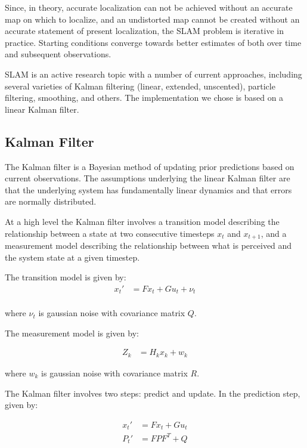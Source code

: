 \documentclass[prodmode,acmtecs]{acmsmall} %
\begin{document}
Since, in theory, accurate localization can not be achieved without an accurate map on which to localize, and an undistorted map cannot be created without an accurate statement of present localization, the SLAM problem is iterative in practice.  Starting conditions converge towards better estimates of both over time and subsequent observations.

SLAM is an active research topic with a number of current approaches, including several varieties of Kalman filtering (linear, extended, unscented), particle filtering, smoothing, and others.  The implementation we chose is based on a linear Kalman filter.

\subsection{Kalman Filter}

The Kalman filter is a Bayesian method of updating prior predictions based on current observations.  The assumptions underlying the linear Kalman filter are that the underlying system has fundamentally linear dynamics and that errors are normally distributed.

At a high level the Kalman filter involves a transition model describing the relationship between a state at two consecutive timesteps $x_t$ and $x_{t+1}$, and a measurement model describing the relationship between what is perceived and the system state at a given timestep.

The transition model is given by:
\begin{align*}
    x_t' &= F x_t + G u_t + \nu_t \\
\end{align*} 

where $\nu_t$ is gaussian noise with covariance matrix $Q$.

The measurement model is given by:

\begin{align*}
    Z_k &= H_k x_k + w_k
\end{align*}

where $w_k$ is gaussian noise with covariance matrix $R$.

The Kalman filter involves two steps: predict and update. In the prediction step, given by:

\begin{align*}
    x_t' &= F x_t + G u_t \\
    P_t' &= F P F^T + Q
\end{align*}
\end{document}
